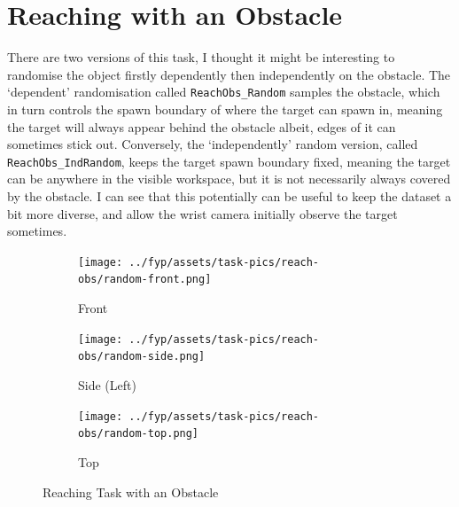 \section{Reaching with an Obstacle}\label{sec:reach-obs}
There are two versions of this task, I thought it might be interesting to randomise the object firstly dependently then independently on the obstacle. The `dependent' randomisation called \verb|ReachObs_Random| samples the obstacle, which in turn controls the spawn boundary of where the target can spawn in, meaning the target will always appear behind the obstacle albeit, edges of it can sometimes stick out. Conversely, the `independently' random version, called \verb|ReachObs_IndRandom|, keeps the target spawn boundary fixed, meaning the target can be anywhere in the visible workspace, but it is not necessarily always covered by the obstacle. I can see that this potentially can be useful to keep the dataset a bit more diverse, and allow the wrist camera initially observe the target sometimes.

\begin{figure}[htpb] %
  \centering
  \begin{subfigure}{0.3\textwidth}
    \centering
    \texttt{[image: ../fyp/assets/task-pics/reach-obs/random-front.png]}
    \caption{Front}\label{fig:reach-obs-random-front}
  \end{subfigure}%

  \begin{subfigure}{0.3\textwidth}
    \centering
    \texttt{[image: ../fyp/assets/task-pics/reach-obs/random-side.png]}
    \caption{Side (Left)}\label{fig:reach-obs-random-side}
  \end{subfigure}%

  \begin{subfigure}{0.3\textwidth}
    \centering
    \texttt{[image: ../fyp/assets/task-pics/reach-obs/random-top.png]}
    \caption{Top}\label{fig:reach-obs-random}
  \end{subfigure}%
  \caption{Reaching Task with an Obstacle}\label{fig:reach-obs-random-left}
\end{figure}%

